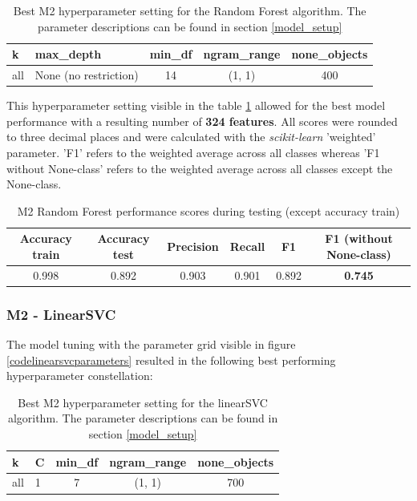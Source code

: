 \begin{table}[h!]
\begin{center}
\caption{Best M2 hyperparameter setting for the Random Forest algorithm. The parameter descriptions can be found in section \ref{model_setup}}\vspace{1ex}
\label{tab:m2_randomForest_bestParams}
\begin{tabular}{llccc}\hline
k & max\_depth & min\_df & ngram\_range & none\_objects \\ \hline
all & None (no restriction) & 14 & (1, 1) & 400 \\ \hline
\end{tabular}
\end{center}
\end{table}

This hyperparameter setting visible in the table \ref{tab:m2_randomForest_bestParams} allowed for the best model performance with a resulting number of \textbf{324 features}. All scores were rounded to three decimal places and were calculated with the \textit{scikit-learn} 'weighted' parameter. 'F1' refers to the weighted average across all classes whereas 'F1 without None-class' refers to the weighted average across all classes except the None-class.

\begin{table}[h!]
\begin{center}
\caption{M2 Random Forest performance scores during testing (except accuracy train)}\vspace{1ex}
\label{tab:m2_randomForest_bestscores}
\begin{tabular}{cccccc}\hline
Accuracy train & Accuracy test & Precision & Recall & F1 & F1 (without None-class)\\ \hline
0.998 & 0.892 & 0.903 & 0.901 & 0.892 & \textbf{0.745}\\ \hline
\end{tabular}
\end{center}
\end{table}

\subsubsection{M2 - LinearSVC}
The model tuning with the parameter grid visible in figure \ref{codelinearsvcparameters} resulted in the following best performing hyperparameter constellation:

\begin{table}[h!]
\begin{center}
\caption{Best M2 hyperparameter setting for the linearSVC algorithm. The parameter descriptions can be found in section \ref{model_setup}}\vspace{1ex}
\label{tab:m2_linearSVC_bestParams}
\begin{tabular}{llccc}\hline
k & C & min\_df & ngram\_range & none\_objects \\ \hline
all & 1 & 7 & (1, 1) & 700 \\ \hline
\end{tabular}
\end{center}
\end{table}

